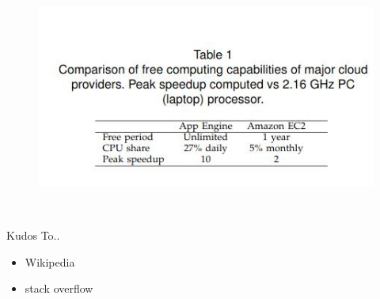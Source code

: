 \documentclass{beamer}
\begin{document}
\begin{frame}
	\begin{figure}
		\centering
		\includegraphics[width=0.7\linewidth]{Throughput3}
	
	
	\end{figure}
	
		
	\
	\end{frame}
\begin{frame}{Kudos}
	To..
	\begin{itemize}
		\item Wikipedia
		\item stack overflow
	\end{itemize}
\end{frame}
\end{document}
